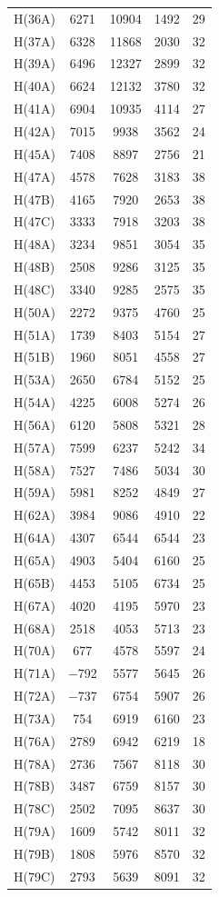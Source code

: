 \begin{center}
{\begin{supertabular}{lcccc}
H(36A)&6271&10904&1492&29\\
H(37A)&6328&11868&2030&32\\
H(39A)&6496&12327&2899&32\\
H(40A)&6624&12132&3780&32\\
H(41A)&6904&10935&4114&27\\
H(42A)&7015&9938&3562&24\\
H(45A)&7408&8897&2756&21\\
H(47A)&4578&7628&3183&38\\
H(47B)&4165&7920&2653&38\\
H(47C)&3333&7918&3203&38\\
H(48A)&3234&9851&3054&35\\
H(48B)&2508&9286&3125&35\\
H(48C)&3340&9285&2575&35\\
H(50A)&2272&9375&4760&25\\
H(51A)&1739&8403&5154&27\\
H(51B)&1960&8051&4558&27\\
H(53A)&2650&6784&5152&25\\
H(54A)&4225&6008&5274&26\\
H(56A)&6120&5808&5321&28\\
H(57A)&7599&6237&5242&34\\
H(58A)&7527&7486&5034&30\\
H(59A)&5981&8252&4849&27\\
H(62A)&3984&9086&4910&22\\
H(64A)&4307&6544&6544&23\\
H(65A)&4903&5404&6160&25\\
H(65B)&4453&5105&6734&25\\
H(67A)&4020&4195&5970&23\\
H(68A)&2518&4053&5713&23\\
H(70A)&677&4578&5597&24\\
H(71A)&$-$792&5577&5645&26\\
H(72A)&$-$737&6754&5907&26\\
H(73A)&754&6919&6160&23\\
H(76A)&2789&6942&6219&18\\
H(78A)&2736&7567&8118&30\\
H(78B)&3487&6759&8157&30\\
H(78C)&2502&7095&8637&30\\
H(79A)&1609&5742&8011&32\\
H(79B)&1808&5976&8570&32\\
H(79C)&2793&5639&8091&32\\

\end{supertabular}}
\end{center}
